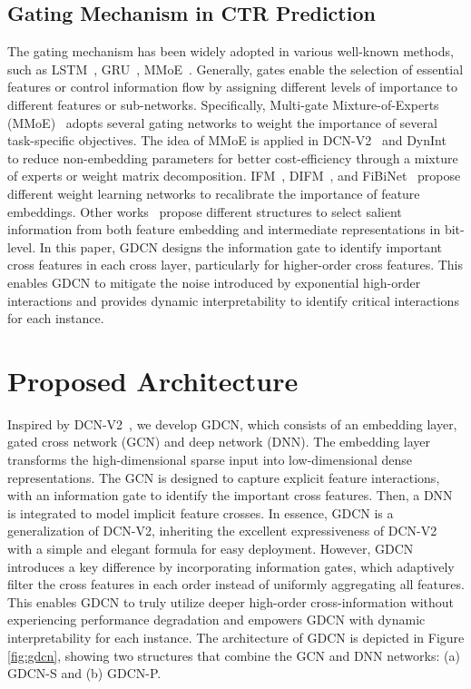 \documentclass[sigconf]{acmart}
\begin{document}
\subsection{Gating Mechanism in CTR Prediction}
The gating mechanism has been widely adopted in various well-known methods, such as LSTM~\cite{hochreiter1997lstm}, GRU~\cite{cho2014gru}, MMoE~\cite{ma2018mmoe}. Generally, gates enable the selection of essential features or control information flow by assigning different levels of importance to different features or sub-networks. Specifically, Multi-gate Mixture-of-Experts (MMoE)~\cite{ma2018mmoe} adopts several gating networks to weight the importance of several task-specific objectives. The idea of MMoE is applied in DCN-V2~\cite{wang2021dcnm} and DynInt~\cite{yan2023dynint} to reduce non-embedding parameters for better cost-efficiency through a mixture of experts or weight matrix decomposition. IFM~\cite{yu2019input}, DIFM~\cite{lu2020dual}, and FiBiNet~\cite{huang2019fibinet} propose different weight learning networks to recalibrate the importance of feature embeddings. Other works~\cite{wang2021contextnet, wang2022mcrf, wang2021masknet, huang2020gatenet, fei2021gemnn} propose different structures to select salient information from both feature embedding and intermediate representations in bit-level. In this paper, GDCN designs the information gate to identify important cross features in each cross layer, particularly for higher-order cross features. This enables GDCN to mitigate the noise introduced by exponential high-order interactions and provides dynamic interpretability to identify critical interactions for each instance.


\section{Proposed Architecture}
Inspired by DCN-V2~\cite{wang2021dcnm}, we develop GDCN, which consists of an embedding layer, gated cross network (GCN) and deep network (DNN). The embedding layer transforms the high-dimensional sparse input into low-dimensional dense representations. The GCN is designed to capture explicit feature interactions, with an information gate to identify the important cross features. Then, a DNN is integrated to model implicit feature crosses. In essence, GDCN is a generalization of DCN-V2, inheriting the excellent expressiveness of DCN-V2 with a simple and elegant formula for easy deployment. However, GDCN introduces a key difference by incorporating information gates, which adaptively filter the cross features in each order instead of uniformly aggregating all features. This enables GDCN to truly utilize deeper high-order cross-information without experiencing performance degradation and empowers GDCN with dynamic interpretability for each instance. The architecture of GDCN is depicted in Figure \ref{fig:gdcn}, showing two structures that combine the GCN and DNN networks: (a) GDCN-S and (b) GDCN-P.
\end{document}
